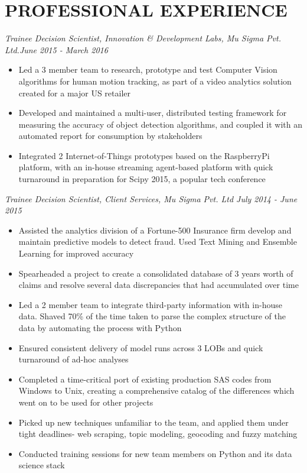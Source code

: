 \documentclass{article}
\begin{document}
\section*{PROFESSIONAL EXPERIENCE}
\noindent
\textit{Trainee Decision Scientist, Innovation \& Development Labs, Mu Sigma Pvt. Ltd.\hfill June 2015 - March 2016}
\begin{itemize}
	\item Led a 3 member team to research, prototype and test Computer Vision algorithms for human motion
tracking, as part of a video analytics solution created for a major US retailer
	\item Developed and maintained a multi-user, distributed testing framework for measuring the accuracy of object
detection algorithms, and coupled it with an automated report for consumption by stakeholders
	\item Integrated 2 Internet-of-Things prototypes based on the RaspberryPi platform, with an in-house streaming agent-based platform with quick turnaround in preparation for Scipy 2015, a popular tech conference
\end{itemize}
\textit{Trainee Decision Scientist, Client Services, Mu Sigma Pvt. Ltd \hfill July 2014 - June 2015}
\begin{itemize}
	\item Assisted the analytics division of a Fortune-500 Insurance firm develop and maintain predictive models to detect fraud. Used Text Mining and Ensemble Learning for improved accuracy
	\item Spearheaded a project to create a consolidated database of 3 years worth of claims and resolve several
data discrepancies that had accumulated over time
	\item Led a 2 member team to integrate third-party information with in-house data. Shaved 70\% of the time taken
to parse the complex structure of the data by automating the process with Python
	\item Ensured consistent delivery of model runs across 3 LOBs and quick turnaround of ad-hoc analyses
	\item Completed a time-critical port of existing production SAS codes from Windows to Unix, creating a
comprehensive catalog of the differences which went on to be used for other projects
	\item Picked up new techniques unfamiliar to the team, and applied them under tight deadlines- web scraping,
topic modeling, geocoding and fuzzy matching
	\item Conducted training sessions for new team members on Python and its data science stack
\end{itemize}
\end{document}
